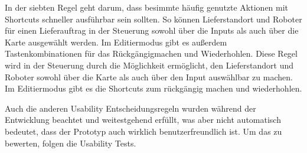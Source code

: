 
In der siebten Regel geht darum, dass besimmte häufig genutzte Aktionen mit Shortcuts schneller ausführbar sein sollten. So können Lieferstandort und Roboter für einen Lieferauftrag in der Steuerung sowohl über die Inputs als auch über die Karte ausgewählt werden. Im Editiermodus gibt es außerdem Tastenkombinationen für das Rückgängigmachen und Wiederhohlen.
Diese Regel wird in der Steuerung durch die Möglichkeit ermöglicht, den Lieferstandort und Roboter sowohl über die Karte als auch über den Input auswählbar zu machen. Im Editiermodus gibt es die Shortcuts zum rückgängig machen und wiederhohlen.




Auch die anderen Usability Entscheidungsregeln wurden während der Entwicklung beachtet und weitestgehend erfüllt, was aber nicht automatisch bedeutet, dass der Prototyp auch wirklich benutzerfreundlich ist. Um das zu bewerten, folgen die Usability Tests.

